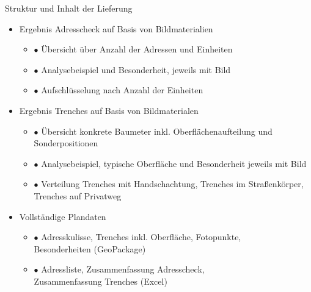 \documentclass[11pt, dvipsnames,aspectratio=169]{beamer}
\newenvironment{bulletlist}[1]{\begin{itemize}\setlength{\itemsep}{#1}}{\end{itemize}}
\begin{document}
\begin{frame}{Struktur und Inhalt der Lieferung \Ort}
	\begin{bulletlist}{5pt}
		\item Ergebnis Adresscheck auf Basis von Bildmaterialien
			\begin{bulletlist}{3pt}
				\item[$\bullet$] Übersicht über Anzahl der Adressen und Einheiten
				\item[$\bullet$] Analysebeispiel und Besonderheit, jeweils mit Bild
				\item[$\bullet$] Aufschlüsselung nach Anzahl der Einheiten
			\end{bulletlist}
		\item Ergebnis Trenches auf Basis von Bildmaterialen
		\begin{bulletlist}{3pt}
			\item[$\bullet$] Übersicht konkrete Baumeter inkl. Oberflächenaufteilung und Sonderpositionen
			\item[$\bullet$] Analysebeispiel, typische Oberfläche und Besonderheit jeweils mit Bild
			\item[$\bullet$] Verteilung Trenches mit Handschachtung, Trenches im Straßenkörper, \\ Trenches auf Privatweg
		\end{bulletlist}
		\item Vollständige Plandaten
		\begin{bulletlist}{3pt}
			\item[$\bullet$] Adresskulisse, Trenches inkl. Oberfläche, Fotopunkte, \\ Besonderheiten (GeoPackage)
			\item[$\bullet$] Adressliste, Zusammenfassung Adresscheck, \\ Zusammenfassung Trenches (Excel)
		\end{bulletlist}
	\end{bulletlist}
\end{frame}
\end{document}

